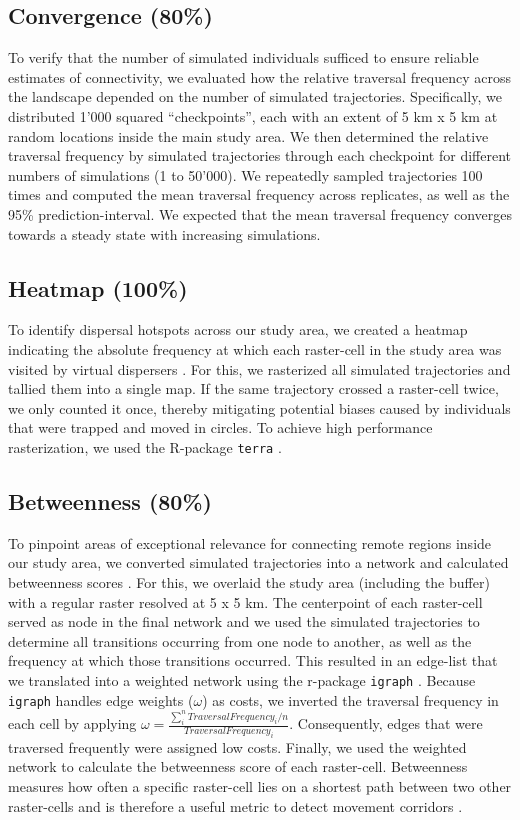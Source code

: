 \documentclass[abstract=on,10pt,a4paper,bibliography=totocnumbered]{article}
\begin{document}
\subsection{Convergence (80\%)}
To verify that the number of simulated individuals sufficed to ensure reliable
estimates of connectivity, we evaluated how the relative traversal frequency
across the landscape depended on the number of simulated trajectories.
Specifically, we distributed 1'000 squared ``checkpoints'', each with an extent
of 5 km x 5 km at random locations inside the main study area. We then
determined the relative traversal frequency by simulated trajectories through
each checkpoint for different numbers of simulations (1 to 50'000). We
repeatedly sampled trajectories 100 times and computed the mean traversal
frequency across replicates, as well as the 95\% prediction-interval. We
expected that the mean traversal frequency converges towards a steady state with
increasing simulations.

\subsection{Heatmap (100\%)}
To identify dispersal hotspots across our study area, we created a heatmap
indicating the absolute frequency at which each raster-cell in the study area
was visited by virtual dispersers \citep{Hauenstein.2019, Peer.2008}. For this,
we rasterized all simulated trajectories and tallied them into a single map. If
the same trajectory crossed a raster-cell twice, we only counted it once,
thereby mitigating potential biases caused by individuals that were trapped and
moved in circles. To achieve high performance rasterization, we used the
R-package {\tt terra} \citep{Hijmans.2020}.

\subsection{Betweenness (80\%)}
To pinpoint areas of exceptional relevance for connecting remote regions inside
our study area, we converted simulated trajectories into a network and
calculated betweenness scores \citep{BastilleRousseau.2018}. For this, we
overlaid the study area (including the buffer) with a regular raster resolved at
5 x 5 km. The centerpoint of each raster-cell served as node in the final
network and we used the simulated trajectories to determine all transitions
occurring from one node to another, as well as the frequency at which those
transitions occurred. This resulted in an edge-list that we translated into a
weighted network using the r-package {\tt igraph} \citep{Gabor.2006}. Because
{\tt igraph} handles edge weights (\(\omega\)) as costs, we inverted the
traversal frequency in each cell by applying \(\omega = \frac{\sum_i^n{Traversal
Frequency_i}/n}{Traversal Frequency_i}\). Consequently, edges that were
traversed frequently were assigned low costs. Finally, we used the weighted
network to calculate the betweenness score of each raster-cell. Betweenness
measures how often a specific raster-cell lies on a shortest path between two
other raster-cells and is therefore a useful metric to detect movement corridors
\citep{BastilleRousseau.2018}.
\end{document}

